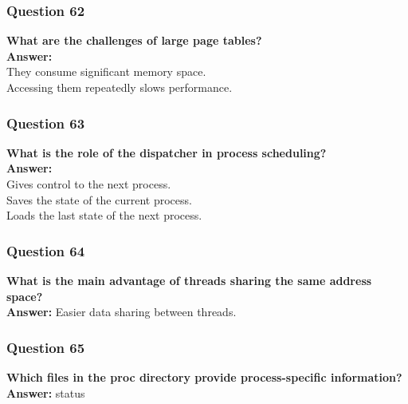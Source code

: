 \documentclass{article}
\begin{document}
\subsubsection*{Question 62}
\textbf{What are the challenges of large page tables?} \\
\textbf{Answer:} \\
They consume significant memory space. \\
Accessing them repeatedly slows performance.

\subsubsection*{Question 63}
\textbf{What is the role of the dispatcher in process scheduling?} \\
\textbf{Answer:} \\ 
Gives control to the next process. \\
Saves the state of the current process. \\
Loads the last state of the next process.

\subsubsection*{Question 64}
\textbf{What is the main advantage of threads sharing the same address space?} \\
\textbf{Answer:} Easier data sharing between threads.

\subsubsection*{Question 65}
\textbf{Which files in the proc directory provide process-specific information?} \\
\textbf{Answer:} status
\end{document}
